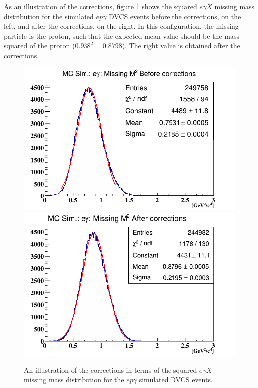 As an illustration of the corrections, figure \ref{fig:egamma_difference} shows the squared $e\gamma X$ missing mass distribution for the simulated $ep\gamma$ DVCS events before the corrections, on the left, and after the corrections, on the right. In this configuration, the missing particle is the proton, such that the expected mean value should be the mass squared of the proton ($0.938^{2} = 0.8798$). The right value is obtained after the corrections.

\begin{figure}[tp]
\centering
\includegraphics[scale=0.32]{fig_simulation/egamma_MM2_before_corrections.png}
\includegraphics[scale=0.32]{fig_simulation/egamma_MM2_after_corrections.png}
\caption{An illustration of the corrections in terms of the squared $e\gamma X$ missing mass distribution for the $ep\gamma$ simulated DVCS events. } 
\label{fig:egamma_difference}
\end{figure}

